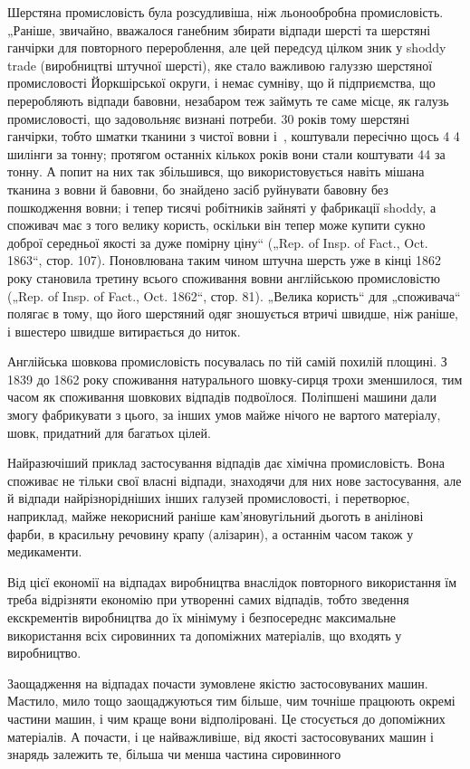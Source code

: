 
Шерстяна промисловість була розсудливіша, ніж льонообробна промисловість. „Раніше, звичайно,
вважалося ганебним
збирати відпади шерсті та шерстяні ганчірки для повторного
перероблення, але цей передсуд цілком зник у shoddy trade
(виробництві штучної шерсті), яке стало важливою галуззю
шерстяної промисловості Йоркшірської округи, і немає сумніву,
що й підприємства, що переробляють відпади бавовни, незабаром теж займуть те саме місце, як галузь
промисловості, що
задовольняє визнані потреби. 30 років тому шерстяні ганчірки,
тобто шматки тканини з чистої вовни і~, коштували пересічно щось 4 4 шилінги
за тонну; протягом
останніх кількох років вони стали коштувати 44 за тонну. А попит на них так
збільшився, що використовується
навіть мішана тканина з вовни й бавовни, бо знайдено засіб
руйнувати бавовну без пошкодження вовни; і тепер тисячі робітників зайняті у фабрикації shoddy, а
споживач має з того
велику користь, оскільки він тепер може купити сукно доброї
середньої якості за дуже помірну ціну“ („Rep. of Insp. of Fact.,
Oct. 1863“, стор. 107). Поновлювана таким чином штучна шерсть
уже в кінці 1862 року становила третину всього споживання
вовни англійською промисловістю („Rep. of Insp. of Fact., Oct.
1862“, стор. 81). „Велика користь“ для „споживача“ полягає в тому,
що його шерстяний одяг зношується втричі швидше, ніж раніше,
і вшестеро швидше витирається до ниток.

Англійська шовкова промисловість посувалась по тій самій
похилій площині. З 1839 до 1862 року споживання натурального
шовку-сирця трохи зменшилося, тим часом як споживання шовкових відпадів подвоїлося. Поліпшені машини
дали змогу фабрикувати з цього, за інших умов майже нічого не вартого матеріалу, шовк, придатний для
багатьох цілей.

Найразючіший приклад застосування відпадів дає хімічна
промисловість. Вона споживає не тільки свої власні відпади,
знаходячи для них нове застосування, але й відпади найрізнорідніших інших галузей промисловості, і
перетворює, наприклад,
майже некорисний раніше кам’яновугільний дьоготь в анілінові
фарби, в красильну речовину крапу (алізарин), а останнім часом
також у медикаменти.

Від цієї економії на відпадах виробництва внаслідок повторного використання їм треба відрізняти
економію при утворенні
самих відпадів, тобто зведення екскрементів виробництва до
їх мінімуму і безпосереднє максимальне використання всіх сировинних та допоміжних матеріалів, що
входять у виробництво.

Заощадження на відпадах почасти зумовлене якістю застосовуваних машин. Мастило, мило тощо
заощаджуються тим
більше, чим точніше працюють окремі частини машин, і чим краще
вони відполіровані. Це стосується до допоміжних матеріалів.
А почасти, і це найважливіше, від якості застосовуваних машин
і знарядь залежить те, більша чи менша частина сировинного
\parbreak{}  %
